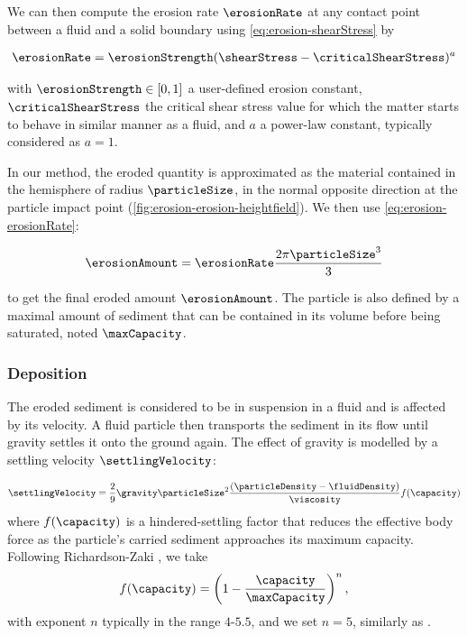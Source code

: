 We can then compute the erosion rate $\erosionRate$ at any contact point between a fluid and a solid boundary using \eqref{eq:erosion-shearStress} by 

\begin{align}
    \label{eq:erosion-erosionRate}
    \erosionRate = \erosionStrength (\shearStress - \criticalShearStress)^a
\end{align}

with $\erosionStrength \in [0,1]$ a user-defined erosion constant, $\criticalShearStress$ the critical shear stress value for which the matter starts to behave in similar manner as a fluid, and $a$ a power-law constant, typically considered as $a = 1$. 

In our method, the eroded quantity is approximated as the material contained in the hemisphere of radius $\particleSize$, in the normal opposite direction at the particle impact point (\cref{fig:erosion-erosion-heightfield}). We then use \eqref{eq:erosion-erosionRate}: 

\begin{align}
    \label{eq:erosion-erosionAmount} 
    \erosionAmount = \erosionRate \frac{ 2 \pi \particleSize^3 }{ 3 }
\end{align}

to get the final eroded amount $\erosionAmount$. The particle is also defined by a maximal amount of sediment that can be contained in its volume before being saturated, noted $\maxCapacity$. %

\subsubsection{Deposition}
The eroded sediment is considered to be in suspension in a fluid and is affected by its velocity. A fluid particle then transports the sediment in its flow until gravity settles it onto the ground again. The effect of gravity is modelled by a settling velocity $\settlingVelocity$:

\begin{align} 
    \label{eq:erosion-initialSettlingVelocity}
    \settlingVelocity = \frac{ 2 }{ 9 }  \gravity \particleSize^2 \frac{(\particleDensity - \fluidDensity)}{\viscosity } f(\capacity)
\end{align} 
where $f(\capacity)$ is a hindered-settling factor that reduces the effective body force as the particle's carried sediment approaches its maximum capacity. Following Richardson-Zaki \cite{Richardson1954}, we take
\begin{align}
    \label{eq:erosion-Richardson}
    f(\capacity) = \left(1 - \frac{\capacity}{\maxCapacity}\right)^{n},
\end{align}
with exponent $n$ typically in the range $4$-$5.5$, and we set $n=5$, similarly as \cite{Wojtan2007}.

